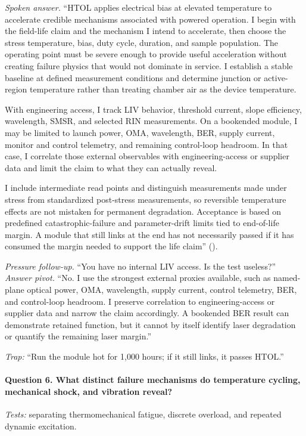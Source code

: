 \textit{Spoken answer.}
``HTOL applies electrical bias at elevated temperature to accelerate credible
mechanisms associated with powered operation. I begin with the field-life claim
and the mechanism I intend to accelerate, then choose the stress temperature,
bias, duty cycle, duration, and sample population. The operating point must be
severe enough to provide useful acceleration without creating failure physics
that would not dominate in service. I establish a stable baseline at defined
measurement conditions and determine junction or active-region temperature
rather than treating chamber air as the device temperature.

With engineering access, I track LIV behavior, threshold current, slope
efficiency, wavelength, SMSR, and selected RIN measurements. On a bookended
module, I may be limited to launch power, OMA, wavelength, BER, supply current,
monitor and control telemetry, and remaining control-loop headroom. In that
case, I correlate those external observables with engineering-access or supplier
data and limit the claim to what they can actually reveal.

I include intermediate read points and distinguish measurements made under
stress from standardized post-stress measurements, so reversible temperature
effects are not mistaken for permanent degradation. Acceptance is based on
predefined catastrophic-failure and parameter-drift limits tied to end-of-life
margin. A module that still links at the end has not necessarily passed if it
has consumed the margin needed to support the life claim''
().

\textit{Pressure follow-up.} ``You have no internal LIV access. Is the test
useless?''\\
\textit{Answer pivot.} ``No. I use the strongest external proxies available,
such as named-plane optical power, OMA, wavelength, supply current, control
telemetry, BER, and control-loop headroom. I preserve correlation to
engineering-access or supplier data and narrow the claim accordingly. A
bookended BER result can demonstrate retained function, but it cannot by itself
identify laser degradation or quantify the remaining laser margin.''

\textit{Trap:} ``Run the module hot for 1,000 hours; if it still links, it
passes HTOL.''

\paragraph{Question 6. What distinct failure mechanisms do temperature
cycling, mechanical shock, and vibration reveal?}
\textit{Tests:} separating thermomechanical fatigue, discrete overload, and
repeated dynamic excitation.

